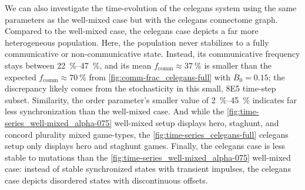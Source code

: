 \documentclass[10pt,letterpaper]{article}
\begin{document}
We can also investigate the time-evolution of the \gls{celegans} system
using the same parameters as the
well-mixed case but with the \gls{celegans} connectome graph.
Compared to the well-mixed case,
the  \gls{celegans} case
depicts a far more heterogeneous population.
Here, the population never stabilizes
to a fully communicative or non-communicative state.
Instead, its communicative frequency stays between
\SIrange{22}{47}{\percent},
and its mean $f_{\text{comm}} \approx \SI{37}{\percent}$
is smaller than the expected $f_{\text{comm}} \approx \SI{70}{\percent}$
from \cref{fig:comm-frac_celegans-full} with $B_0 = 0.15$;
the discrepancy likely comes from the stochasticity
in this small, \num{8E5} time-step subset.
Similarity, the order parameter's smaller value of \SIrange{2}{45}{\percent}
indicates far less synchronization than the well-mixed case.
And while the \cref{fig:time-series_well-mixed_alpha-075} well-mixed setup
displays hero, staghunt, and concord plurality mixed game-types,
the \cref{fig:time-series_celegans-full} \gls{celegans} setup
only displays hero and staghunt games.
Finally, the \gls{celegans} case is less stable to mutations
than the \cref{fig:time-series_well-mixed_alpha-075} well-mixed case:
instead of stable synchronized states with transient impulses,
the \gls{celegans} case depicts disordered states with discontinuous offsets.
\end{document}
